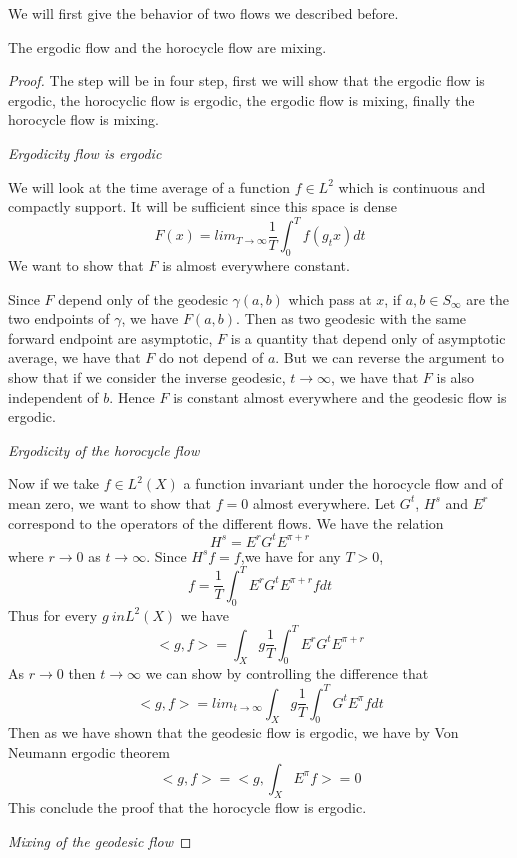 We will first give the behavior of two flows we described before.

\begin{thm}
The ergodic flow and the horocycle flow are mixing.
\end{thm}

\cite{Mcmullen1998HyperbolicM}

\begin{proof}
The step will be in four step, first we will show that the ergodic flow is ergodic, the horocyclic flow is ergodic, the ergodic flow is mixing, finally the horocycle flow is mixing.

\emph{Ergodicity flow is ergodic}

We will look at the time average of a function $f \in L^2$ which is continuous and compactly support. It will be sufficient since this space is dense \[
F(x) = lim_{T \to \infty} \frac{1}{T} \int_0^T f(g_t x)dt
\]
We want to show that $F$ is almost everywhere constant.

Since $F$ depend only of the geodesic $\gamma(a,b)$ which pass at $x$, if $a,b \in S_\infty$ are the two endpoints of $\gamma$, we have $F(a,b)$.
Then as two geodesic with the same forward endpoint are asymptotic, $F$ is a quantity that depend only of asymptotic average, we have that $F$ do not depend of $a$.
But we can reverse the argument to show that if we consider the inverse geodesic, $t \to \infty$, we have that $F$ is also independent of $b$. Hence $F$ is constant almost everywhere and the geodesic flow is ergodic.

\emph{Ergodicity of the horocycle flow}

Now if we take $f \in L^2(X)$ a function invariant under the horocycle flow and of mean zero, we want to show that $f=0$ almost everywhere.
Let $G^t$, $H^s$ and $E^r$ correspond to the operators of the different flows. We have the relation \[
H^s=E^r G^t E^{\pi+r}
\]
where $r \to 0$ as $t \to \infty$. Since $H^s f=f$,we have for any $T>0$,\[
f=\frac{1}{T} \int_0^T E^r G^t E^{\pi+r} f dt
\]
Thus for every $g\ in L^2(X)$ we have \[
<g,f> = \int_X g \frac{1}{T} \int_0^T E^r G^t E^{\pi+r}
\]
As $r \to 0$ then $t \to \infty$ we can show by controlling the difference that \[
<g,f> = lim_{t \to \infty} \int_X g \frac{1}{T} \int_0^T G^t E^{\pi} f dt
\]
Then as we have shown that the geodesic flow is ergodic, we have by Von Neumann ergodic theorem\[
<g,f> = <g,\int_X E^{\pi} f> =0
\]
This conclude the proof that the horocycle flow is ergodic.

\emph{Mixing of the geodesic flow}


\end{proof}
